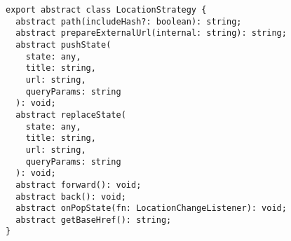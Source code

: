 \begin{verbatim}
export abstract class LocationStrategy {
  abstract path(includeHash?: boolean): string;
  abstract prepareExternalUrl(internal: string): string;
  abstract pushState(
    state: any,
    title: string,
    url: string,
    queryParams: string
  ): void;
  abstract replaceState(
    state: any,
    title: string,
    url: string,
    queryParams: string
  ): void;
  abstract forward(): void;
  abstract back(): void;
  abstract onPopState(fn: LocationChangeListener): void;
  abstract getBaseHref(): string;
}
\end{verbatim}
